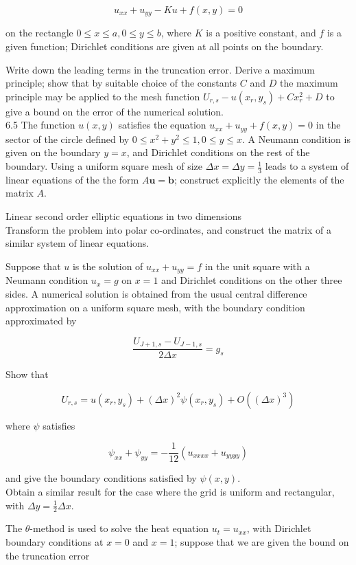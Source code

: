 \documentclass[10pt]{article}
\begin{document}
\[
u_{x x}+u_{y y}-K u+f(x, y)=0
\]

on the rectangle \(0 \leq x \leq a, 0 \leq y \leq b\), where \(K\) is a positive constant, and \(f\) is a given function; Dirichlet conditions are given at all points on the boundary.

Write down the leading terms in the truncation error. Derive a maximum principle; show that by suitable choice of the constants \(C\) and \(D\) the maximum principle may be applied to the mesh function \(U_{r, s}-u\left(x_{r}, y_{s}\right)+C x_{r}^{2}+D\) to give a bound on the error of the numerical solution.\\
6.5 The function \(u(x, y)\) satisfies the equation \(u_{x x}+u_{y y}+f(x, y)=0\) in the sector of the circle defined by \(0 \leq x^{2}+y^{2} \leq 1,0 \leq y \leq x\). A Neumann condition is given on the boundary \(y=x\), and Dirichlet conditions on the rest of the boundary. Using a uniform square mesh of size \(\Delta x=\Delta y=\frac{1}{3}\) leads to a system of linear equations of the the form \(A \mathbf{u}=\mathbf{b}\); construct explicitly the elements of the matrix \(A\).

Linear second order elliptic equations in two dimensions\\
Transform the problem into polar co-ordinates, and construct the matrix of a similar system of linear equations.

Suppose that \(u\) is the solution of \(u_{x x}+u_{y y}=f\) in the unit square with a Neumann condition \(u_{x}=g\) on \(x=1\) and Dirichlet conditions on the other three sides. A numerical solution is obtained from the usual central difference approximation on a uniform square mesh, with the boundary condition approximated by

\[
\frac{U_{J+1, s}-U_{J-1, s}}{2 \Delta x}=g_{s}
\]

Show that

\[
U_{r, s}=u\left(x_{r}, y_{s}\right)+(\Delta x)^{2} \psi\left(x_{r}, y_{s}\right)+O\left((\Delta x)^{3}\right)
\]

where \(\psi\) satisfies

\[
\psi_{x x}+\psi_{y y}=-\frac{1}{12}\left(u_{x x x x}+u_{y y y y}\right)
\]

and give the boundary conditions satisfied by \(\psi(x, y)\).\\
Obtain a similar result for the case where the grid is uniform and rectangular, with \(\Delta y=\frac{1}{2} \Delta x\).

The \(\theta\)-method is used to solve the heat equation \(u_{t}=u_{x x}\), with Dirichlet boundary conditions at \(x=0\) and \(x=1\); suppose that we are given the bound on the truncation error
\end{document}
